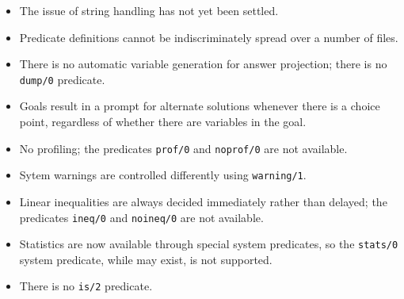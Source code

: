 \begin{itemize}
\item The issue of string handling has not yet been settled.
\item Predicate definitions cannot be indiscriminately spread over a
number of files.
\item There is no automatic variable generation for answer projection;
there is no {\tt dump/0} predicate.
\item Goals result in a prompt for alternate solutions whenever there is a
choice point, regardless of whether there are variables in the goal. 
\item No profiling; the predicates {\tt prof/0} and {\tt noprof/0} are
not available.
\item Sytem warnings are controlled differently using {\tt warning/1}.
\item Linear inequalities are always decided immediately rather than delayed;
the predicates {\tt ineq/0} and {\tt noineq/0} are not available.
\item Statistics are now available through special system predicates, so the
{\tt stats/0} system predicate, while may exist, is not supported.
\item There is no {\tt is/2} predicate.
\end{itemize}



